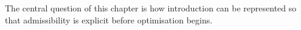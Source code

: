 The central question of this chapter is how introduction can be represented so that admissibility is explicit before optimisation begins.
